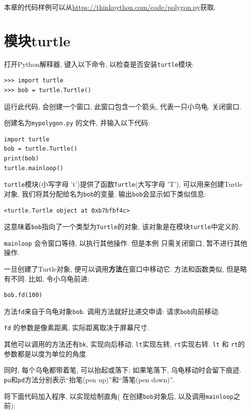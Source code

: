 \documentclass[10pt]{book}
\begin{document}
本章的代码样例可以从\url{https://thinkpython.com/code/polygon.py}获取. 


\section{模块turtle}
\label{turtle}

打开Python解释器, 键入以下命令, 以检查是否安装{\tt turtle}模块:

\begin{verbatim}
>>> import turtle
>>> bob = turtle.Turtle()
\end{verbatim}

运行此代码, 会创建一个窗口, 此窗口包含一个箭头, 代表一只小乌龟. 
关闭窗口. 

创建名为{\tt mypolygon.py} 的文件, 并输入以下代码:

\begin{verbatim}
import turtle
bob = turtle.Turtle()
print(bob)
turtle.mainloop()
\end{verbatim}
%
{\tt turtle}模块(小写字母 't')提供了函数{\tt Turtle}(大写字母 'T'), 
可以用来创建Turtle 对象, 我们将其分配给名为{\tt bob}的变量. 
输出{\tt bob}会显示如下类似信息:

\begin{verbatim}
<turtle.Turtle object at 0xb7bfbf4c>
\end{verbatim}
%
这意味着{\tt bob}指向了一个类型为{\tt Turtle}的对象, 
该对象是在模块{\tt turtle}中定义的.

\verb"mainloop" 会令窗口等待, 以执行其他操作. 但是本例
只需关闭窗口, 暂不进行其他操作. 

一旦创建了Turtle对象, 便可以调用{\bf 方法}在窗口中移动它. 
方法和函数类似, 但是略有不同. 比如, 令小乌龟前进:

\begin{verbatim}
bob.fd(100)
\end{verbatim}
%
方法{\tt fd}来自于乌龟对象{\tt bob}. 
调用方法就好比递交申请: 请求{\tt bob}向前移动. 

{\tt fd} 的参数是像素距离, 实际距离取决于屏幕尺寸. 

其他可以调用的方法还有{\tt bk}, 实现向后移动, 
{\tt lt}实现左转, {\tt rt}实现右转. 
{\tt lt} 和 {\tt rt}的参数都是以度为单位的角度. 

同时, 每个乌龟都带着笔, 可以抬起或落下;
如果笔落下, 乌龟移动时会留下痕迹. 
{\tt pu}和{\tt pd}方法分别表示``抬笔(pen up)''和``落笔(pen down)''.

将下面代码加入程序, 以实现绘制直角(
在创建{\tt bob}对象后, 以及调用\verb"mainloop"之前):
\end{document}
